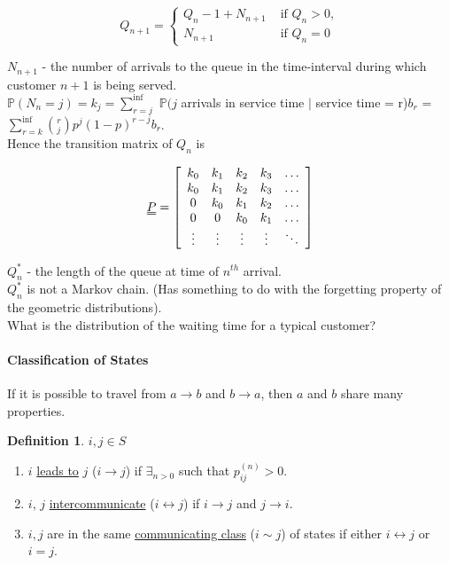 \documentclass{article}
\theoremstyle{definition}
\newtheorem{defn}[thm]{Definition}
\newcommand{\PP}{\mathbb{P}}
\begin{document}
\[
Q_{n+1} = \begin{cases} Q_n - 1 + N_{n+1} & \mbox{ if } Q_n > 0,\\ N_{n+1} & \mbox{ if } Q_n = 0 \end{cases}
\]

$N_{n+1}$ - the number of arrivals to the queue in the time-interval during which customer $n+1$ is being served.\\

$\PP(N_n = j) = k_j = \sum_{r=j}^{\inf}$ $\PP(j$ arrivals in service time $\mid$ service time = r)$b_r$ = $\sum_{r=k}^{\inf} \binom{r}{j} p^j(1-p)^{r-j}b_r$.\\

Hence the transition matrix of $Q_n$ is

\[
\uuline{P} = \left [ \begin{array}{ccccc}
k_0 & k_1 & k_2 & k_3 & \hdots\\
k_0 & k_1 & k_2 & k_3 & \hdots\\
0 & k_0 & k_1 & k_2 & \hdots\\
0 & 0 & k_0 & k_1 & \hdots\\
\vdots & \vdots & \vdots & \vdots & \ddots\\
\end{array} \right ]
\]

$Q_n^{\ast}$ - the length of the queue at time of $n^{th}$ arrival.\\

$Q_n^{\ast}$ is not a Markov chain. (Has something to do with the forgetting property of the geometric distributions).\\

What is the distribution of the waiting time for a typical customer?

\paragraph*{Classification of States}

If it is possible to travel from $a \rightarrow b$ and $b \rightarrow a$, then $a$ and $b$ share many properties.

\begin{defn} $i,j \in S$
\begin{enumerate}
\item
$i$ \uline{leads to} $j$ ($i \rightarrow j$) if $\exists_{n>0}$ such that $p_{ij}^{(n)} > 0$.
\item
$i$, $j$ \uline{intercommunicate} ($i \leftrightarrow j$) if $i \rightarrow j$ and $j \rightarrow i$.
\item
$i, j$ are in the same \uline{communicating class} ($i \sim j$) of states if either $i \leftrightarrow j$ or $i = j$.
\end{enumerate}
\end{defn}
\end{document}
